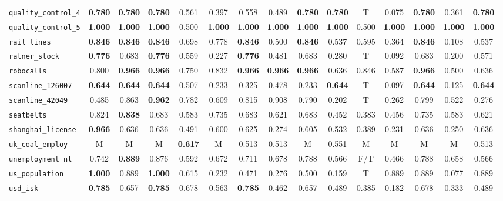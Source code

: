 \begin{tabular}{lcccccccccccccc}
\verb+quality_control_4+ & \textbf{0.780} & \textbf{0.780} & \textbf{0.780} & 0.561 & 0.397 & 0.558 & 0.489 & \textbf{0.780} & \textbf{0.780} & T & 0.075 & \textbf{0.780} & 0.361 & \textbf{0.780}\\
\verb+quality_control_5+ & \textbf{1.000} & \textbf{1.000} & \textbf{1.000} & 0.500 & \textbf{1.000} & \textbf{1.000} & \textbf{1.000} & \textbf{1.000} & \textbf{1.000} & 0.500 & \textbf{1.000} & \textbf{1.000} & \textbf{1.000} & \textbf{1.000}\\
\verb+rail_lines+ & \textbf{0.846} & \textbf{0.846} & \textbf{0.846} & 0.698 & 0.778 & \textbf{0.846} & 0.500 & \textbf{0.846} & 0.537 & 0.595 & 0.364 & \textbf{0.846} & 0.108 & 0.537\\
\verb+ratner_stock+ & \textbf{0.776} & 0.683 & \textbf{0.776} & 0.559 & 0.227 & \textbf{0.776} & 0.481 & 0.683 & 0.280 & T & 0.092 & 0.683 & 0.200 & 0.571\\
\verb+robocalls+ & 0.800 & \textbf{0.966} & \textbf{0.966} & 0.750 & 0.832 & \textbf{0.966} & \textbf{0.966} & \textbf{0.966} & 0.636 & 0.846 & 0.587 & \textbf{0.966} & 0.500 & 0.636\\
\verb+scanline_126007+ & \textbf{0.644} & \textbf{0.644} & \textbf{0.644} & 0.507 & 0.233 & 0.325 & 0.478 & 0.233 & \textbf{0.644} & T & 0.097 & \textbf{0.644} & 0.125 & \textbf{0.644}\\
\verb+scanline_42049+ & 0.485 & 0.863 & \textbf{0.962} & 0.782 & 0.609 & 0.815 & 0.908 & 0.790 & 0.202 & T & 0.262 & 0.799 & 0.522 & 0.276\\
\verb+seatbelts+ & 0.824 & \textbf{0.838} & 0.683 & 0.583 & 0.735 & 0.683 & 0.621 & 0.683 & 0.452 & 0.383 & 0.456 & 0.735 & 0.583 & 0.621\\
\verb+shanghai_license+ & \textbf{0.966} & 0.636 & 0.636 & 0.491 & 0.600 & 0.625 & 0.274 & 0.605 & 0.532 & 0.389 & 0.231 & 0.636 & 0.250 & 0.636\\
\verb+uk_coal_employ+ & M & M & M & \textbf{0.617} & M & 0.513 & 0.513 & M & 0.551 & M & M & M & M & 0.513\\
\verb+unemployment_nl+ & 0.742 & \textbf{0.889} & 0.876 & 0.592 & 0.672 & 0.711 & 0.678 & 0.788 & 0.566 & F/T & 0.466 & 0.788 & 0.658 & 0.566\\
\verb+us_population+ & \textbf{1.000} & 0.889 & \textbf{1.000} & 0.615 & 0.232 & 0.471 & 0.276 & 0.500 & 0.159 & T & 0.889 & 0.889 & 0.077 & 0.889\\
\verb+usd_isk+ & \textbf{0.785} & 0.657 & \textbf{0.785} & 0.678 & 0.563 & \textbf{0.785} & 0.462 & 0.657 & 0.489 & 0.385 & 0.182 & 0.678 & 0.333 & 0.489\\

\end{tabular}
